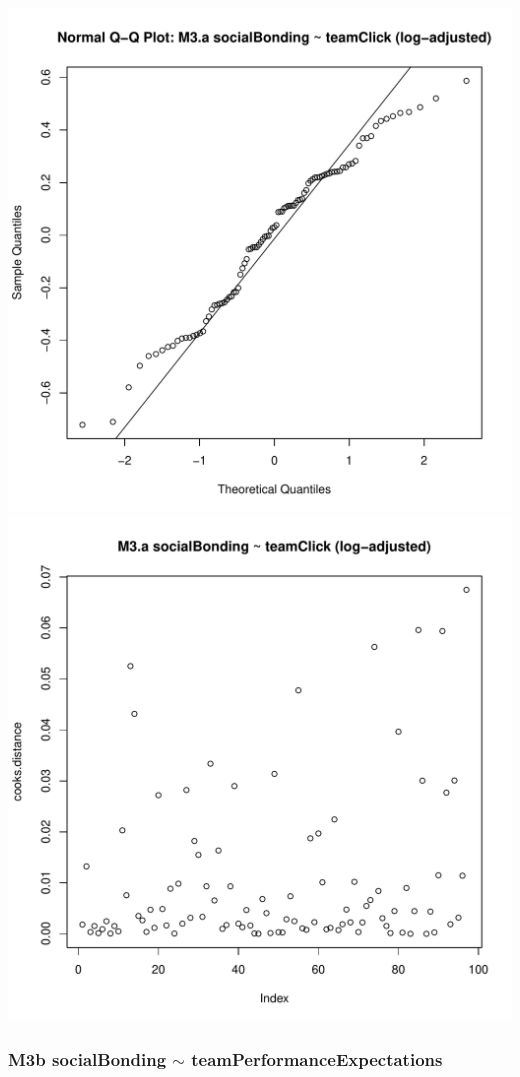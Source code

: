 \documentclass[12pt]{report}
\begin{document}
\includegraphics[scale =.4]{../images/MLM3aLogQQNorm.pdf}
\includegraphics[scale =.4]{../images/MLM3aLogCooksD.pdf}

\newpage
\subsubsection{M3b socialBonding $\sim$ teamPerformanceExpectations}
\end{document}
